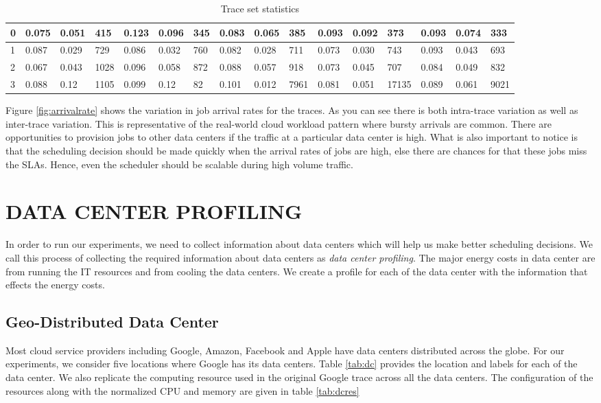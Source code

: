 \documentclass[conference,12pt]{IEEEtran}
\begin{document}
\begin{table}[]
{\begin{tabular}{|l|l|l|l|l|l|l|l|l|l|l|l|l|l|l|l|}
0 & 0.075 & 0.051 & 415 & 0.123 & 0.096 & 345 & 0.083 & 0.065 & 385 & 0.093 & 0.092 & 373 & 0.093 & 0.074 & 333 \\ \hline
1 & 0.087 & 0.029 & 729 & 0.086 & 0.032 & 760 & 0.082 & 0.028 & 711 & 0.073 & 0.030 & 743 & 0.093 & 0.043 & 693 \\ \hline
2 & 0.067 & 0.043 & 1028 & 0.096 & 0.058 & 872 & 0.088 & 0.057 & 918 & 0.073 & 0.045 & 707 & 0.084 & 0.049 & 832 \\ \hline
3 & 0.088 & 0.12 & 1105 & 0.099 & 0.12 & 82 & 0.101 & 0.012 & 7961 & 0.081 & 0.051 & 17135 & 0.089 & 0.061 & 9021 \\ \hline
\end{tabular}
}
\caption {Trace set statistics} \label{tab:tracestat} 
\end{table}

Figure \ref{fig:arrivalrate} shows the variation in job arrival rates for the traces. As you can see there is both intra-trace variation as well as inter-trace variation. This is representative of the real-world cloud workload pattern where bursty arrivals are common. There are opportunities to provision jobs to other data centers if the traffic at a particular data center is high. What is also important to notice is that the scheduling decision should be made quickly when the arrival rates of jobs are high, else there are chances for that these jobs miss the SLAs. Hence, even the scheduler should be scalable during high volume traffic. 



\section{DATA CENTER PROFILING } \label{sec:datacenter}
In order to run our experiments, we need to collect information about data centers which will help us make better scheduling decisions. We call this process of collecting the required information about data centers as \textit{data center profiling}. The major energy costs in data center are from running the IT resources and from cooling the data centers. We create a profile for each of the data center with the information that effects the energy costs.

\subsection{Geo-Distributed Data Center}
Most cloud service providers including Google, Amazon, Facebook and Apple have data centers distributed across the globe. For our experiments, we consider five locations where Google has its data centers\cite{googlelocation}. Table \ref{tab:dc} provides the location and labels for each of the data center. We also replicate the computing resource used in the original Google trace across all the data centers. The configuration of the resources along with the normalized CPU and memory are given in table \ref{tab:dcres}
\end{document}
